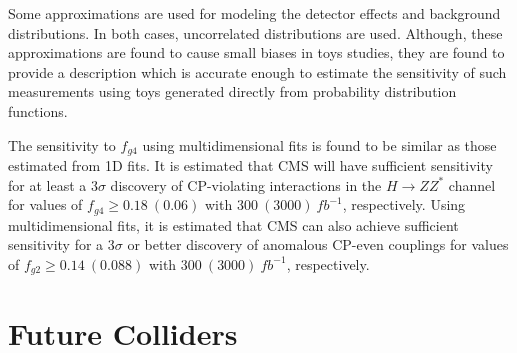 Some approximations are used for modeling the detector
effects and background distributions.  In both cases,
uncorrelated distributions are used.  Although, these
approximations are found to cause 
small biases in toys studies, they are found to provide 
a description which is accurate enough to estimate the
sensitivity of such measurements using toys generated
directly from probability distribution functions.

The sensitivity to $f_{g4}$ using multidimensional fits
is found to be similar as those estimated from 1D fits.  
It is estimated that CMS will have sufficient sensitivity for
at least a $3\sigma$ discovery of CP-violating interactions in 
the $H\to ZZ^*$ channel for values of $f_{g4}\geq0.18~(0.06)$
 with $300~(3000)~fb^{-1}$, respectively.
Using multidimensional fits, it is estimated that CMS can also
achieve sufficient sensitivity 
for a $3\sigma$ or better discovery of anomalous CP-even 
couplings for values of $f_{g2}\geq0.14~(0.088)$ with 
$300~(3000)~fb^{-1}$, respectively.

\section{Future Colliders}

